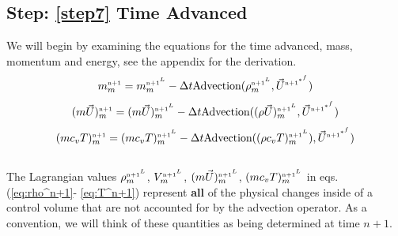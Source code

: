 \documentclass[fleqn]{article}
\begin{document}
{\subsection{Step: \ref{step7} \textsf{Time Advanced} }
  We will begin by examining the equations for the time advanced, mass,
  momentum and energy, see the appendix for the derivation.
%
\begin{equation}
    \label{eq:rho^n+1}
       \massnnm = \massnnLm -
       \delt \text{Advection}( \rhonnL_{m} , \ustar )
\end{equation}   
%      
\begin{equation}
    \label{eq:u^n+1}
       \momnnm =
       \momnnLm  - \delt \text{Advection}((\rho \vec{U})^{\nadv^{L}}_{m} , \ustar)
\end{equation}
%
\begin{equation}
    \label{eq:T^n+1}
       \engnnm = \engnnLm -
       \delt \text{Advection}((\rho c_{v} T)^{\nadv^{L}}_{m}), \ustar)
\end{equation}
%
%
\\
The Lagrangian values $\rhonnLm$, $\VnnLm$, $\momnnLm$, $\engnnLm$ in
eqs. (\ref{eq:rho^n+1}- \ref{eq:T^n+1}) represent \textbf{all} of the
physical changes inside of a control volume that are not accounted for by
the advection operator.  As a convention, we will think of these quantities
as being determined at time $n+1$.  \\

%
%
%
%
%
%
%
%
\newpage
}
\end{document}
